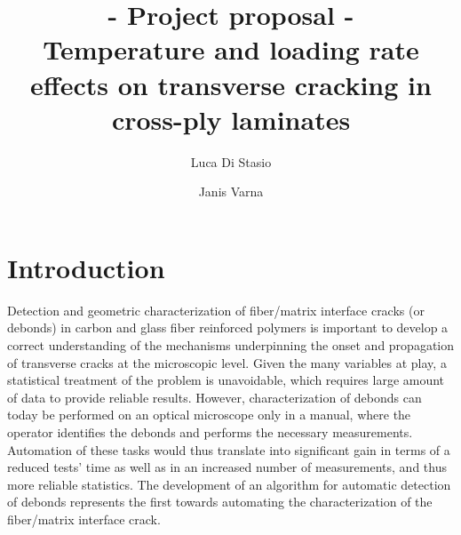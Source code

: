 \documentclass[review]{elsarticle}
\begin{document}
\begin{frontmatter}

\title{{\bf - Project proposal -}\\Temperature and loading rate effects on transverse cracking in cross-ply laminates}


\author{Luca Di Stasio}
\author{Janis Varna}






\end{frontmatter}

\linenumbers

\section{Introduction}

Detection and geometric characterization of fiber/matrix interface cracks (or debonds) in carbon and glass fiber reinforced polymers is important to develop a correct understanding of the mechanisms underpinning the onset and propagation of transverse cracks at the microscopic level. Given the many variables at play, a statistical treatment of the problem is unavoidable, which requires large amount of data to provide reliable results. However, characterization of debonds can today be performed on an optical microscope only in a manual, where the operator identifies the debonds and performs the necessary measurements. Automation of these tasks would thus translate into significant gain in terms of a reduced tests' time as well as in an increased number of measurements, and thus more reliable statistics. The development of an algorithm for automatic detection of debonds represents the first towards automating the characterization of the fiber/matrix interface crack.
\end{document}
